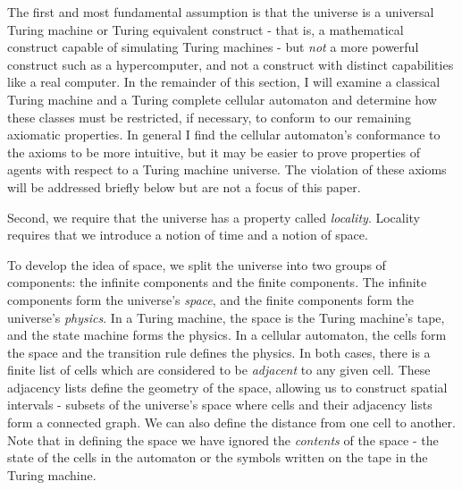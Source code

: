 \documentclass[12pt]{article}
\begin{document}
The first and most fundamental assumption is that the universe is a universal
Turing machine or Turing equivalent construct - that is, a mathematical
construct capable of simulating Turing machines - but \textit{not} a more
powerful construct such as a hypercomputer, and not a construct with distinct
capabilities like a real computer\footnotemark. In the remainder of this
section, I will examine a classical Turing machine and a Turing complete
cellular automaton and determine how these classes must be restricted, if
necessary, to conform to our remaining axiomatic properties. In general I find
the cellular automaton's conformance to the axioms to be more
intuitive\footnotemark, but it may be easier to prove properties of agents with
respect to a Turing machine universe. The violation of these axioms will be
addressed briefly below but are not a focus of this paper.



Second, we require that the universe has a property called \textit{locality}.
Locality requires that we introduce a notion of time and a notion of space.

To develop the idea of space, we split the universe into two groups of
components: the infinite components and the finite components. The infinite
components form the universe's \textit{space}, and the finite components form
the universe's \textit{physics}. In a Turing machine, the space is the Turing
machine's tape, and the state machine forms the physics. In a cellular
automaton, the cells form the space and the transition rule defines the physics.
In both cases, there is a finite list of cells which are considered to be
\textit{adjacent} to any given cell. These adjacency lists define the geometry
of the space, allowing us to construct spatial intervals - subsets of the
universe's space where cells and their adjacency lists form a connected graph.
We can also define the distance from one cell to another.
Note that in defining the space we have ignored the \textit{contents} of the
space - the state of the cells in the automaton or the symbols written on the
tape in the Turing machine.
\end{document}
